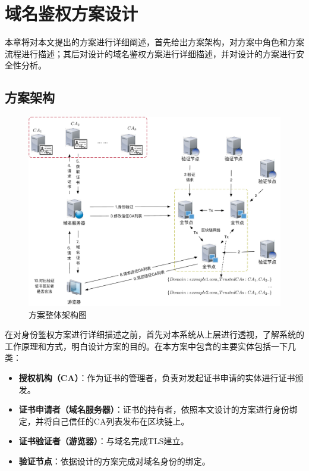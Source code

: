 
\chapter{域名鉴权方案设计}

本章将对本文提出的方案进行详细阐述，首先给出方案架构，对方案中角色和方案流程进行描述；其后对设计的域名鉴权方案进行详细描述，并对设计的方案进行安全性分析。


\section{方案架构}

\begin{figure}[!htbp]
 	\centering
 	\includegraphics[width = 1\textwidth]{img/arti}
 	\caption{方案整体架构图}\label{fig:arti}
\end{figure}

在对身份鉴权方案进行详细描述之前，首先对本系统从上层进行透视，了解系统的工作原理和方式，明白设计方案的目的。在本方案中包含的主要实体包括一下几类：
\begin{itemize}
	\item \textbf{授权机构（CA）}：作为证书的管理者，负责对发起证书申请的实体进行证书颁发。
	\item \textbf{证书申请者（域名服务器）}：证书的持有者，依照本文设计的方案进行身份绑定，并将自己信任的CA列表发布在区块链上。
	\item \textbf{证书验证者（游览器）}：与域名完成TLS建立。
	\item \textbf{验证节点}：依据设计的方案完成对域名身份的绑定。
\end{itemize}


